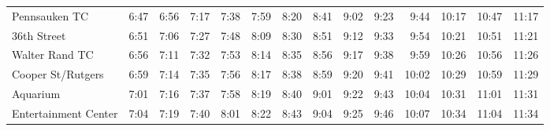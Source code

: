 \begin{center}
\begin{tabular}{@{}lrrrrrrrrrrrrr@{}}
Pennsauken TC & 6:47 & 6:56 & 7:17 & 7:38 & 7:59 & 8:20 & 8:41 & 9:02 & 9:23 & 9:44 & 10:17 & 10:47 & 11:17 \\
36th Street & 6:51 & 7:06 & 7:27 & 7:48 & 8:09 & 8:30 & 8:51 & 9:12 & 9:33 & 9:54 & 10:21 & 10:51 & 11:21 \\
Walter Rand TC & 6:56 & 7:11 & 7:32 & 7:53 & 8:14 & 8:35 & 8:56 & 9:17 & 9:38 & 9:59 & 10:26 & 10:56 & 11:26 \\
Cooper St/Rutgers & 6:59 & 7:14 & 7:35 & 7:56 & 8:17 & 8:38 & 8:59 & 9:20 & 9:41 & 10:02 & 10:29 & 10:59 & 11:29 \\
Aquarium & 7:01 & 7:16 & 7:37 & 7:58 & 8:19 & 8:40 & 9:01 & 9:22 & 9:43 & 10:04 & 10:31 & 11:01 & 11:31 \\
Entertainment Center & 7:04 & 7:19 & 7:40 & 8:01 & 8:22 & 8:43 & 9:04 & 9:25 & 9:46 & 10:07 & 10:34 & 11:04 & 11:34 \\
\bottomrule\end{tabular}\end{center}
